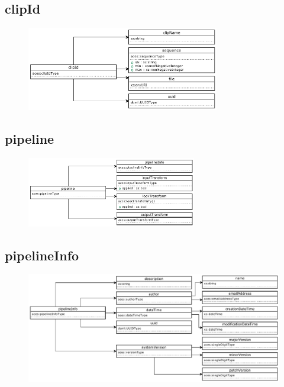 \subsection{clipId}
\begin{figure}[H]
  \centering
  \includegraphics[width=0.75\textwidth]{./uml_diagrams/uml_clipId.pdf}
\end{figure}

\subsection{pipeline}
\begin{figure}[H]
  \centering
  \includegraphics[width=0.66\textwidth]{./uml_diagrams/uml_pipeline.pdf}
\end{figure}

\subsection{pipelineInfo}
\begin{figure}[H]
  \centering
  \includegraphics[width=\textwidth]{./uml_diagrams/uml_pipelineInfo.pdf}
\end{figure}

